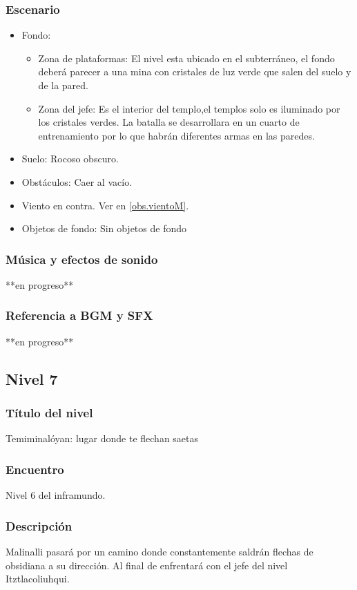 \documentclass[11pt,letterpaper]{article}
\begin{document}
\subsubsection{Escenario}
\begin{itemize} 
	\item Fondo:
	\begin{itemize}
		\item Zona de plataformas:
		El nivel esta ubicado en el subterráneo, el fondo deberá parecer a una mina con cristales de luz verde que salen del suelo y de la pared.
		\item Zona del jefe:
		Es el interior del templo,el templos solo es iluminado por los cristales verdes. La batalla se desarrollara en un cuarto de entrenamiento por lo que habrán diferentes armas en las paredes.
	\end{itemize}
	\item Suelo: Rocoso obscuro.
	\item Obstáculos: Caer al vacío.
	\item Viento en contra. Ver en \ref{obs.vientoM}.
	\item Objetos de fondo: Sin objetos de fondo
\end{itemize}	
	\subsubsection{Música y efectos de sonido}
	**en progreso**
	\subsubsection{Referencia a BGM y SFX}
	**en progreso**
	
		\subsection{Nivel 7}
	\subsubsection{Título del nivel}
	Temiminalóyan: lugar donde te flechan saetas
	\subsubsection{Encuentro}
	Nivel 6 del inframundo.
	\subsubsection{Descripción}
	Malinalli pasará por un camino donde constantemente saldrán flechas de obsidiana a su dirección. Al final de enfrentará con el jefe del nivel Itztlacoliuhqui.
\end{document}
